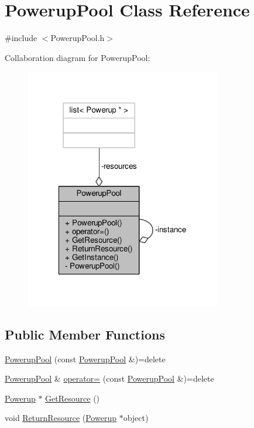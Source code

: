 \hypertarget{class_powerup_pool}{\section{Powerup\-Pool Class Reference}
\label{class_powerup_pool}
}


{\ttfamily \#include $<$Powerup\-Pool.\-h$>$}



Collaboration diagram for Powerup\-Pool\-:
\nopagebreak
\begin{figure}[H]
\begin{center}
\leavevmode
\includegraphics[width=243pt]{class_powerup_pool__coll__graph}
\end{center}
\end{figure}
\subsection*{Public Member Functions}
\begin{DoxyCompactItemize}
\item 
\hyperlink{class_powerup_pool_af0ac859c18848626748b795b890400a4}{Powerup\-Pool} (const \hyperlink{class_powerup_pool}{Powerup\-Pool} \&)=delete
\item 
\hyperlink{class_powerup_pool}{Powerup\-Pool} \& \hyperlink{class_powerup_pool_ab0abab3cf40b0163579e04e595bbd90b}{operator=} (const \hyperlink{class_powerup_pool}{Powerup\-Pool} \&)=delete
\item 
\hyperlink{class_powerup}{Powerup} $\ast$ \hyperlink{class_powerup_pool_a4b223578b11932dc8e82edc48d06d65f}{Get\-Resource} ()
\item 
void \hyperlink{class_powerup_pool_a18b9675b28e4079fb5049abca99e7dee}{Return\-Resource} (\hyperlink{class_powerup}{Powerup} $\ast$object)
\end{DoxyCompactItemize}
